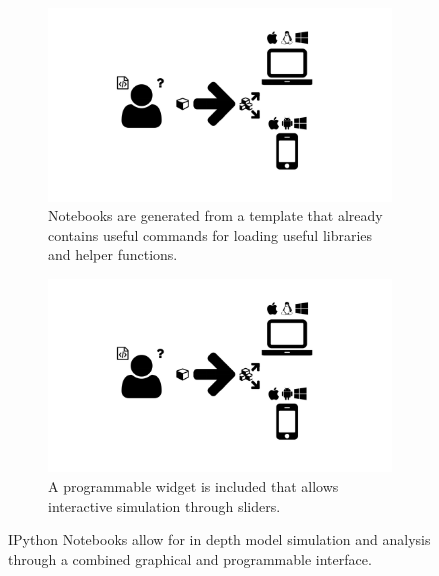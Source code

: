 \begin{figure}
  \centering
  \begin{subfigure}[b]{\textwidth}
    \includegraphics[width=\textwidth,page=13,trim=0.37cm 3.65cm 13.1cm 3.3cm, clip=true]{images/Figures.pdf}
    \caption{Notebooks are generated from a template that already contains useful commands for loading useful libraries and helper functions.}
    \label{Figure:carbon-ipython-template}
  \end{subfigure}
  \begin{subfigure}[b]{\textwidth}
    \includegraphics[width=\textwidth,page=13,trim=13.1cm 3.65cm 0.37cm 3.3cm, clip=true]{images/Figures.pdf}
    \caption{A programmable widget is included that allows interactive simulation through sliders.}
    \label{Figure:carbon-ipython-widget}
  \end{subfigure}
  \caption{IPython Notebooks allow for in depth model simulation and analysis through a combined graphical and programmable interface.}
  \label{Figure:carbon-ipython}
\end{figure}

